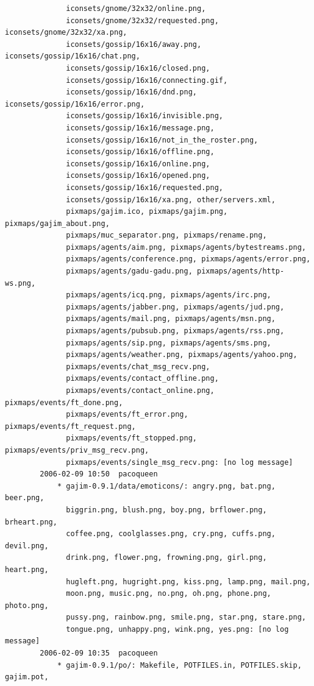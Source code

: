 \documentclass[a4paper]{article}
\begin{document}
\begin{verbatim}
              iconsets/gnome/32x32/online.png,
              iconsets/gnome/32x32/requested.png, iconsets/gnome/32x32/xa.png,
              iconsets/gossip/16x16/away.png, iconsets/gossip/16x16/chat.png,
              iconsets/gossip/16x16/closed.png,
              iconsets/gossip/16x16/connecting.gif,
              iconsets/gossip/16x16/dnd.png, iconsets/gossip/16x16/error.png,
              iconsets/gossip/16x16/invisible.png,
              iconsets/gossip/16x16/message.png,
              iconsets/gossip/16x16/not_in_the_roster.png,
              iconsets/gossip/16x16/offline.png,
              iconsets/gossip/16x16/online.png,
              iconsets/gossip/16x16/opened.png,
              iconsets/gossip/16x16/requested.png,
              iconsets/gossip/16x16/xa.png, other/servers.xml,
              pixmaps/gajim.ico, pixmaps/gajim.png, pixmaps/gajim_about.png,
              pixmaps/muc_separator.png, pixmaps/rename.png,
              pixmaps/agents/aim.png, pixmaps/agents/bytestreams.png,
              pixmaps/agents/conference.png, pixmaps/agents/error.png,
              pixmaps/agents/gadu-gadu.png, pixmaps/agents/http-ws.png,
              pixmaps/agents/icq.png, pixmaps/agents/irc.png,
              pixmaps/agents/jabber.png, pixmaps/agents/jud.png,
              pixmaps/agents/mail.png, pixmaps/agents/msn.png,
              pixmaps/agents/pubsub.png, pixmaps/agents/rss.png,
              pixmaps/agents/sip.png, pixmaps/agents/sms.png,
              pixmaps/agents/weather.png, pixmaps/agents/yahoo.png,
              pixmaps/events/chat_msg_recv.png,
              pixmaps/events/contact_offline.png,
              pixmaps/events/contact_online.png, pixmaps/events/ft_done.png,
              pixmaps/events/ft_error.png, pixmaps/events/ft_request.png,
              pixmaps/events/ft_stopped.png, pixmaps/events/priv_msg_recv.png,
              pixmaps/events/single_msg_recv.png: [no log message]
        2006-02-09 10:50  pacoqueen
            * gajim-0.9.1/data/emoticons/: angry.png, bat.png, beer.png,
              biggrin.png, blush.png, boy.png, brflower.png, brheart.png,
              coffee.png, coolglasses.png, cry.png, cuffs.png, devil.png,
              drink.png, flower.png, frowning.png, girl.png, heart.png,
              hugleft.png, hugright.png, kiss.png, lamp.png, mail.png,
              moon.png, music.png, no.png, oh.png, phone.png, photo.png,
              pussy.png, rainbow.png, smile.png, star.png, stare.png,
              tongue.png, unhappy.png, wink.png, yes.png: [no log message]
        2006-02-09 10:35  pacoqueen
            * gajim-0.9.1/po/: Makefile, POTFILES.in, POTFILES.skip, gajim.pot,

\end{verbatim}
\end{document}

